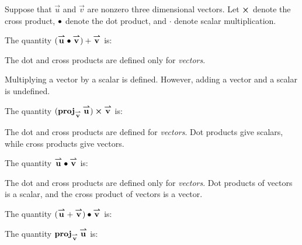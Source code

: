 \documentclass{ximera}
\author{Jim Talamo}
\begin{document}
\begin{exercise}
Suppose that $\vec u $ and $\vec v $ are nonzero three dimensional vectors.  Let $\cross$ denote the cross product, $\dotp$ denote the dot product, and $\cdot$ denote scalar multiplication.

The quantity $(\vec u \dotp \vec v)+ \vec v$ is:

\begin{multipleChoice}
\end{multipleChoice}


\begin{hint}
The dot and cross products are defined only for \emph{vectors}.
\end{hint}

\begin{hint}
Multiplying a vector by a scalar is defined. However, adding a vector and a scalar is undefined.
\end{hint}



The quantity $(\proj_{\vec v} \vec u)\cross \vec v$ is:

\begin{multipleChoice}
\end{multipleChoice}


\begin{hint}
The dot and cross products are defined for \emph{vectors}.  Dot products give scalars, while cross products give vectors.
\end{hint}


The quantity $\vec u \dotp \vec v$ is:

\begin{multipleChoice}
\end{multipleChoice}

\begin{hint}
The dot and cross products are defined only for \emph{vectors}.  Dot products of vectors is a scalar, and the cross product of vectors is a vector.
\end{hint}


The quantity $(\vec u + \vec v) \dotp  \vec v$ is:
\begin{multipleChoice}
\end{multipleChoice}


The quantity $\proj_{\vec v} \vec u$ is:

\begin{multipleChoice}
\end{multipleChoice}





\end{exercise}
\end{document}

